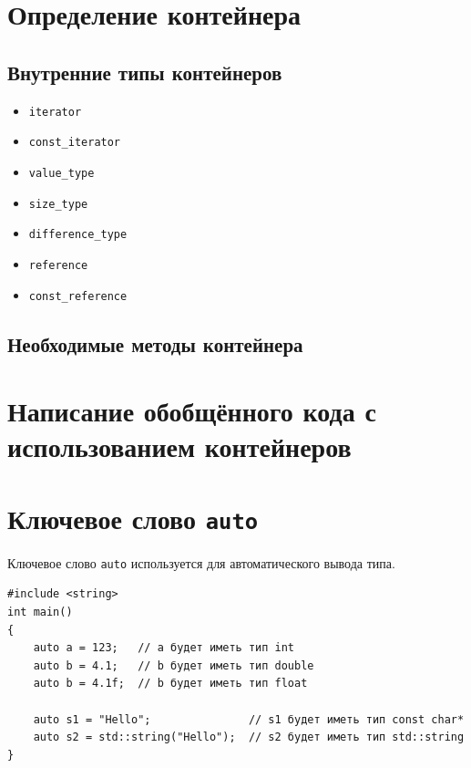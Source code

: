 \documentclass{article}
\begin{document}
\newpage


\section*{Определение контейнера}

\subsection*{Внутренние типы контейнеров}
\begin{itemize}
\item \texttt{iterator}
\item \texttt{const\_iterator}
\item \texttt{value\_type}
\item \texttt{size\_type}
\item \texttt{difference\_type}
\item \texttt{reference}
\item \texttt{const\_reference}
\end{itemize}

\subsection*{Необходимые методы контейнера}

\section*{Написание обобщённого кода с использованием контейнеров}

\newpage
\iffalse
\section*{Ключевое слово \texttt{auto}}
Ключевое слово \texttt{auto} используется для автоматического вывода типа.
\begin{lstlisting}
#include <string>
int main() 
{
    auto a = 123;   // a будет иметь тип int
    auto b = 4.1;   // b будет иметь тип double
    auto b = 4.1f;  // b будет иметь тип float
    
    auto s1 = "Hello";               // s1 будет иметь тип const char*
    auto s2 = std::string("Hello");  // s2 будет иметь тип std::string
}

\end{lstlisting}
\end{document}
